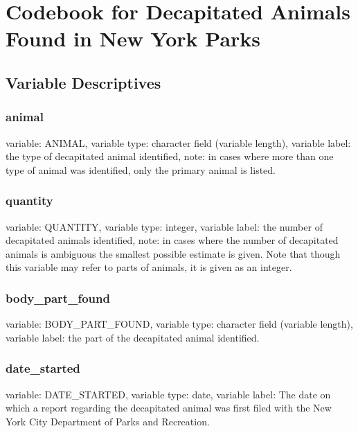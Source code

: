 \documentclass[]{article}
\date{}
\begin{document}
\section{Codebook for Decapitated Animals Found in New York
Parks}\label{codebook-for-decapitated-animals-found-in-new-york-parks}

\subsection{Variable Descriptives}\label{variable-descriptives}

\subsubsection{animal}\label{animal}

variable: ANIMAL, variable type: character field (variable length),
variable label: the type of decapitated animal identified, note: in
cases where more than one type of animal was identified, only the
primary animal is listed.

\subsubsection{quantity}\label{quantity}

variable: QUANTITY, variable type: integer, variable label: the number
of decapitated animals identified, note: in cases where the number of
decapitated animals is ambiguous the smallest possible estimate is
given. Note that though this variable may refer to parts of animals, it
is given as an integer.

\subsubsection{body\_part\_found}\label{bodyux5fpartux5ffound}

variable: BODY\_PART\_FOUND, variable type: character field (variable
length), variable label: the part of the decapitated animal identified.

\subsubsection{date\_started}\label{dateux5fstarted}

variable: DATE\_STARTED, variable type: date, variable label: The date
on which a report regarding the decapitated animal was first filed with
the New York City Department of Parks and Recreation.
\end{document}
